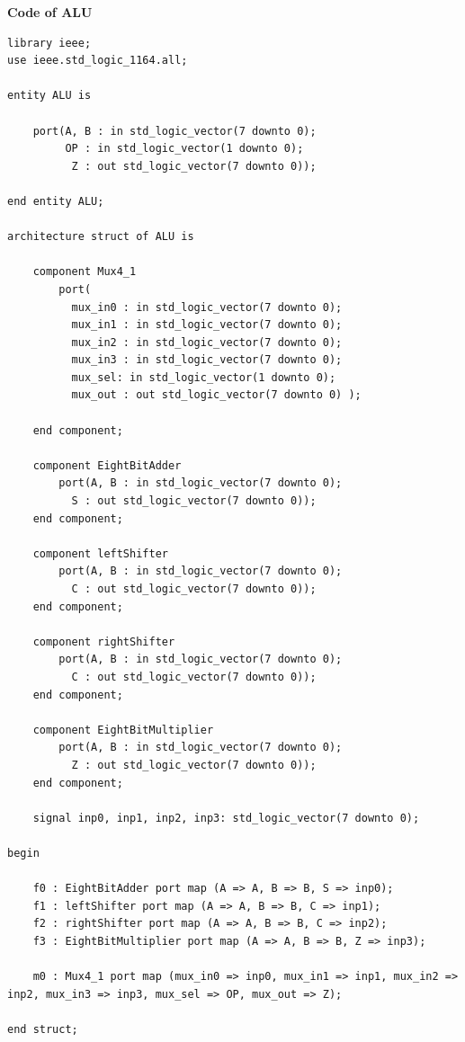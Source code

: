 \documentclass[12pt]{article}
\begin{document}
        \newpage
        \noindent
        \textbf{Code of ALU}
        \noindent
        \begin{verbatim}
library ieee;
use ieee.std_logic_1164.all;

entity ALU is

	port(A, B : in std_logic_vector(7 downto 0);
		 OP : in std_logic_vector(1 downto 0);
		  Z : out std_logic_vector(7 downto 0));
		  
end entity ALU;

architecture struct of ALU is

	component Mux4_1
		port(
          mux_in0 : in std_logic_vector(7 downto 0);
          mux_in1 : in std_logic_vector(7 downto 0);
          mux_in2 : in std_logic_vector(7 downto 0);
          mux_in3 : in std_logic_vector(7 downto 0);
          mux_sel: in std_logic_vector(1 downto 0);
          mux_out : out std_logic_vector(7 downto 0) );

	end component;

	component EightBitAdder
		port(A, B : in std_logic_vector(7 downto 0);
		  S : out std_logic_vector(7 downto 0));
	end component;

	component leftShifter
		port(A, B : in std_logic_vector(7 downto 0);
		  C : out std_logic_vector(7 downto 0));
	end component;

	component rightShifter
		port(A, B : in std_logic_vector(7 downto 0);
		  C : out std_logic_vector(7 downto 0));
	end component;

	component EightBitMultiplier
		port(A, B : in std_logic_vector(7 downto 0);
		  Z : out std_logic_vector(7 downto 0));
	end component;

	signal inp0, inp1, inp2, inp3: std_logic_vector(7 downto 0);
	
begin

	f0 : EightBitAdder port map (A => A, B => B, S => inp0);
	f1 : leftShifter port map (A => A, B => B, C => inp1);
	f2 : rightShifter port map (A => A, B => B, C => inp2);
	f3 : EightBitMultiplier port map (A => A, B => B, Z => inp3);

	m0 : Mux4_1 port map (mux_in0 => inp0, mux_in1 => inp1, mux_in2 => inp2, mux_in3 => inp3, mux_sel => OP, mux_out => Z);
	
end struct;
        \end{verbatim}

\end{document}
